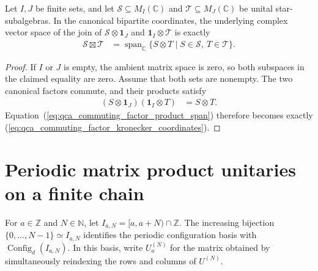 \begin{lemma}
    \label{thm:qca_commuting_factor_kronecker_coordinates}
    \leanok
    Let $I,J$ be finite sets, and let
    $\mathcal S\subseteq M_I(\mathbb C)$ and
    $\mathcal T\subseteq M_J(\mathbb C)$ be unital star-subalgebras.  In
    the canonical bipartite coordinates, the underlying complex vector
    space of the join of $\mathcal S\otimes\mathbf 1_J$ and
    $\mathbf 1_I\otimes\mathcal T$ is exactly
    \begin{align}
        \mathcal S\boxtimes\mathcal T
         & =\operatorname{span}_{\mathbb C}
        \{S\otimes T\mid S\in\mathcal S,\ T\in\mathcal T\}.
        \label{eq:qca_commuting_factor_kronecker_coordinates}
    \end{align}
\end{lemma}

\begin{proof}\leanok
    If $I$ or $J$ is empty, the ambient matrix space is zero, so both
    subspaces in the claimed equality are zero.  Assume that both sets are
    nonempty.  The two canonical factors commute, and their products satisfy
    \begin{align}
        (S\otimes\mathbf 1_J)(\mathbf 1_I\otimes T)
         & =S\otimes T.
    \end{align}
    Equation~(\ref{eq:qca_commuting_factor_product_span}) therefore becomes
    exactly
    (\ref{eq:qca_commuting_factor_kronecker_coordinates}).
\end{proof}

\section{Periodic matrix product unitaries on a finite chain}

\begin{definition}
    \label{def:mpu_finite_chain_realization}
    \leanok
    For $a\in\mathbb Z$ and $N\in\mathbb N$, let
    $I_{a,N}=[a,a+N)\cap\mathbb Z$.  The increasing bijection
    $\{0,\ldots,N-1\}\simeq I_{a,N}$ identifies the periodic configuration
    basis with $\operatorname{Config}_d(I_{a,N})$.  In this basis, write
    $U_{a}^{(N)}$ for the matrix obtained by simultaneously reindexing the rows
    and columns of $U^{(N)}$.
\end{definition}

